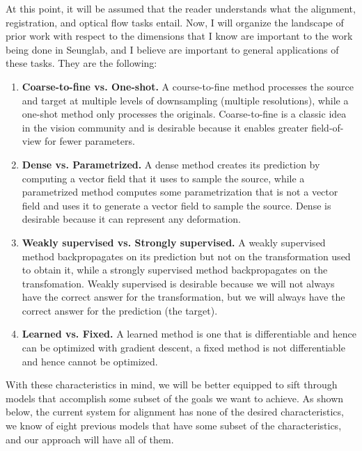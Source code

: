 \documentclass[12pt,a4paper]{article}
\begin{document}
At this point, it will be assumed that the reader understands what the alignment, registration, and optical flow tasks entail. Now, I will organize the landscape of prior work with respect to the dimensions that I know are important to the work being done in Seunglab, and I believe are important to general applications of these tasks. They are the following:
\begin{enumerate}
\item {\bf Coarse-to-fine vs. One-shot.} A course-to-fine method processes the source and target at multiple levels of downsampling (multiple resolutions), while a one-shot method only processes the originals. Coarse-to-fine is a classic idea in the vision community and is desirable because it enables greater field-of-view for fewer parameters.
\item {\bf Dense vs. Parametrized. } A dense method creates its prediction by computing a vector field that it uses to sample the source, while a parametrized method computes some parametrization that is not a vector field and uses it to generate a vector field to sample the source. Dense is desirable because it can represent any deformation.
\item {\bf Weakly supervised vs. Strongly supervised.} A weakly supervised method backpropagates on its prediction but not on the transformation used to obtain it, while a strongly supervised method backpropagates on the transfomation. Weakly supervised is desirable because we will not always have the correct answer for the transformation, but we will always have the correct answer for the prediction (the target).
\item {\bf Learned vs. Fixed.} A learned method is one that is differentiable and hence can be optimized with gradient descent, a fixed method is not differentiable and hence cannot be optimized.
\end{enumerate}

With these characteristics in mind, we will be better equipped to sift through models that accomplish some subset of the goals we want to achieve. As shown below, the current system for alignment has none of the desired characteristics, we know of eight previous models that have some subset of the characteristics, and our approach will have all of them. 
\end{document}
